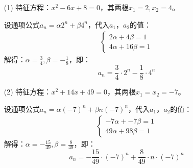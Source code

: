 \begin{solution}
    \begin{enumerate}
        \item[(1)] 特征方程：$x^2-6x+8=0$，其两根$x_1=2,x_2=4$。
 
        设通项公式$a_n = \alpha 2^n +\beta 4^n$，代入$a_1$，$a_2$的值：
        \begin{align*}
            \begin{cases}
                2\alpha + 4\beta = 1\\
                4\alpha + 16\beta = 1
            \end{cases}
        \end{align*}
        解得：$\alpha=\frac{3}{4},\beta=-\frac{1}{8}$，即：
        $$a_n = \frac{3}{4}\cdot 2^n - \frac{1}{8}\cdot 4^n$$
         
        \item[(2)] 特征方程：$x^2+14x+49=0$，其两根$x_1=x_2=-7$。
 
        设通项公式$a_n = \alpha (-7)^n +\beta n(-7)^n$，代入$a_1$，$a_2$的值：
        \begin{align*}
            \begin{cases}
                -7\alpha + -7\beta = 1\\
                49\alpha + 98\beta = 1
            \end{cases}
        \end{align*}
        解得：$\alpha=-\frac{15}{49},\beta=\frac{8}{49}$，即：
        $$a_n = -\frac{15}{49}\cdot(-7)^n +\frac{8}{49}\cdot n\cdot(-7)^n$$
    \end{enumerate}
\end{solution}